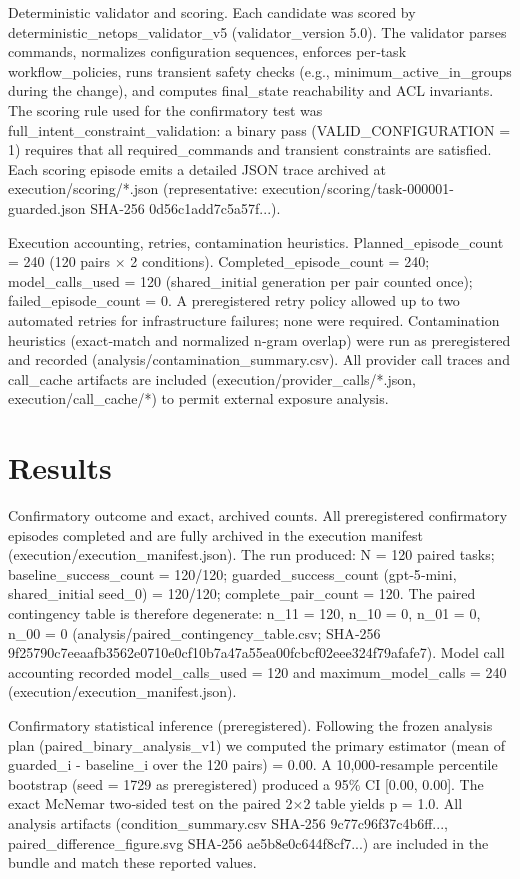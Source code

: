 \documentclass[conference]{IEEEtran}
\begin{document}
Deterministic validator and scoring. Each candidate was scored by deterministic\_netops\_validator\_v5 (validator\_version 5.0). The validator parses commands, normalizes configuration sequences, enforces per‑task workflow\_policies, runs transient safety checks (e.g., minimum\_active\_in\_groups during the change), and computes final\_state reachability and ACL invariants. The scoring rule used for the confirmatory test was full\_intent\_constraint\_validation: a binary pass (VALID\_CONFIGURATION = 1) requires that all required\_commands and transient constraints are satisfied. Each scoring episode emits a detailed JSON trace archived at execution/scoring/*.json (representative: execution/scoring/task-000001-guarded.json SHA‑256 0d56c1add7c5a57f...).

Execution accounting, retries, contamination heuristics. Planned\_episode\_count = 240 (120 pairs \ensuremath{\times} 2 conditions). Completed\_episode\_count = 240; model\_calls\_used = 120 (shared\_initial generation per pair counted once); failed\_episode\_count = 0. A preregistered retry policy allowed up to two automated retries for infrastructure failures; none were required. Contamination heuristics (exact‑match and normalized n‑gram overlap) were run as preregistered and recorded (analysis/contamination\_summary.csv). All provider call traces and call\_cache artifacts are included (execution/provider\_calls/*.json, execution/call\_cache/*) to permit external exposure analysis.

\section{Results}
Confirmatory outcome and exact, archived counts. All preregistered confirmatory episodes completed and are fully archived in the execution manifest (execution/execution\_manifest.json). The run produced: N = 120 paired tasks; baseline\_success\_count = 120/120; guarded\_success\_count (gpt‑5‑mini, shared\_initial seed\_0) = 120/120; complete\_pair\_count = 120. The paired contingency table is therefore degenerate: n\_11 = 120, n\_10 = 0, n\_01 = 0, n\_00 = 0 (analysis/paired\_contingency\_table.csv; SHA‑256 9f25790c7eeaafb3562e0710e0cf10b7a47a55ea00fcbcf02eee324f79afafe7). Model call accounting recorded model\_calls\_used = 120 and maximum\_model\_calls = 240 (execution/execution\_manifest.json).

Confirmatory statistical inference (preregistered). Following the frozen analysis plan (paired\_binary\_analysis\_v1) we computed the primary estimator (mean of guarded\_i - baseline\_i over the 120 pairs) = 0.00. A 10,000‑resample percentile bootstrap (seed = 1729 as preregistered) produced a 95\% CI [0.00, 0.00]. The exact McNemar two‑sided test on the paired 2\ensuremath{\times}2 table yields p = 1.0. All analysis artifacts (condition\_summary.csv SHA‑256 9c77c96f37c4b6ff..., paired\_difference\_figure.svg SHA‑256 ae5b8e0c644f8cf7...) are included in the bundle and match these reported values.
\end{document}
